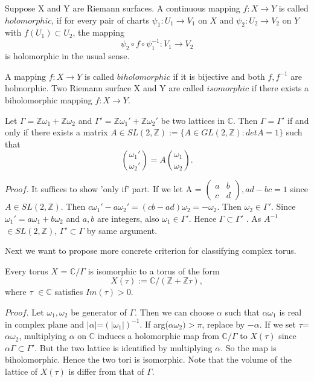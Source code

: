 \begin{defn}
Suppose X and Y are Riemann surfaces. A continuous mapping $f: X \to Y$ is called $holomorphic$, if for every pair of charts $\psi_1 : U_1 \to V_1$ on $X$ and $\psi_2 : U_2 \to V_2$ on $Y$ with $f(U_1) \subset U_2$, the mapping \begin{equation*} \psi_2 \circ f \circ \psi_1^{-1} : V_1 \to V_2
\end{equation*} is holomorphic in the usual sense.

A mapping $f: X \to Y$ is called $biholomorphic$ if it is bijective and both $f,f^{-1}$ are holmorphic. Two Riemann surface X and Y are called $isomorphic$ if there exists a biholomorphic mapping $f:X \to Y$.
\end{defn}
\begin{prop} Let $\Gamma = \mathbb{Z}\omega_1 + \mathbb{Z}\omega_2$ and $\Gamma' = \mathbb{Z}\omega_1' + \mathbb{Z}\omega_2'$ be two lattices in $\mathbb{C}$. Then $\Gamma = \Gamma'$ if and only if there exists a matrix $A \in SL(2,\mathbb{Z}) := \{A \in GL(2,\mathbb{Z}):det A=1 \}$ such that 
\begin{equation*} { \omega_1' \choose \omega_2'} = A { \omega_1 \choose \omega_2}.
\end{equation*}
\end{prop}

$Proof$. It suffices to show 'only if' part. If we let A = $\begin{pmatrix} a & b \\ c & d \end{pmatrix}, ad-bc=1$ since $A \in SL(2,\mathbb{Z})$. Then $c\omega_1' - a\omega_2' = (cb-ad)\omega_2=-\omega_2$. Then $\omega_2 \in \Gamma'$. Since $\omega_1' = a\omega_1+b\omega_2$ and $a,b$ are integers, also $\omega_1  \in \Gamma'$.  Hence $ \Gamma \subset \Gamma'$ . As $A^{-1}$ $\in SL(2,\mathbb{Z})$, $\Gamma' \subset \Gamma$ by same argument.

\vspace{2ex}

Next we want to propose more concrete criterion for classifying complex torus.
\begin{prop} Every torus $X$ = $\mathbb{C}/\Gamma$ is isomorphic to a torus of the form 
\begin{equation*} X(\tau):=\mathbb{C}/(\mathbb{Z}+\mathbb{Z}\tau),
\end{equation*}
where $\tau$ $\in \mathbb{C}$ satisfies $Im(\tau)>0$.
\end{prop}
$Proof$. Let $\omega_1, \omega_2$ be generator of $\Gamma$. Then we can choose $\alpha$ such that $\alpha\omega_1$ is real in complex plane and $\left\vert \alpha \right\vert$=$(\left\vert \omega_1 \right\vert)^{-1}$. If arg($\alpha\omega_2) > \pi$, replace by $-\alpha$.
If we set $\tau$=$\alpha\omega_2$, multiplying $\alpha$ on $\mathbb{C}$ induces a holomorphic map from $\mathbb{C}/\Gamma$ to $X(\tau)$ since $\alpha\Gamma \subset \Gamma'$. But the two lattice is identified by multiplying $\alpha$. So the map is biholomorphic. Hence the two tori is isomorphic. Note that the volume of the lattice of $X(\tau)$ is differ from that of $\Gamma$.



